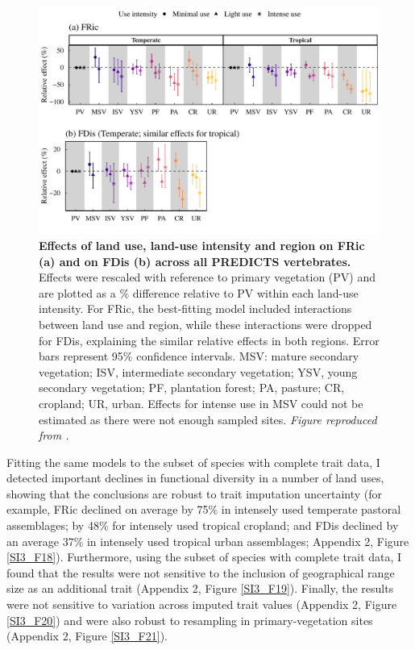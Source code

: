 \begin{figure}[h!]
\centering
\includegraphics[scale=0.75]{figures/Chapter_FD/Figure2}
\caption[Effects of land use, land-use intensity and region on FRic (a) and on FDis (b) across all PREDICTS vertebrates.]{\textbf{ Effects of land use, land-use intensity and region on FRic (a) and on FDis (b) across all PREDICTS vertebrates.} Effects were rescaled with reference to primary vegetation (PV) and are plotted as a \% difference relative to PV within each land-use intensity. For FRic, the best-fitting model included interactions between land use and region, while these interactions were dropped for FDis, explaining the similar relative effects in both regions. Error bars represent 95\% confidence intervals. MSV: mature secondary vegetation; ISV, intermediate secondary vegetation; YSV, young secondary vegetation; PF, plantation forest; PA, pasture; CR, cropland; UR, urban. Effects for intense use in MSV could not be estimated as there were not enough sampled sites. \textit{Figure reproduced from \citet{Etard2022}.}}
\label{chap3_fig2}
\end{figure}

Fitting the same models to the subset of species with complete trait data, I detected important declines in functional diversity in a number of land uses, showing that the conclusions are robust to trait imputation uncertainty (for example, FRic declined on average by 75\% in intensely used temperate pastoral assemblages; by 48\% for intensely used tropical cropland; and FDis declined by an average 37\% in intensely used tropical urban assemblages; Appendix 2, Figure \ref{SI3_F18}). Furthermore, using the subset of species with complete trait data, I found that the results were not sensitive to the inclusion of geographical range size as an additional trait (Appendix 2, Figure \ref{SI3_F19}). Finally, the results were not sensitive to variation across imputed trait values (Appendix 2, Figure \ref{SI3_F20}) and were also robust to resampling in primary-vegetation sites (Appendix 2, Figure \ref{SI3_F21}).

